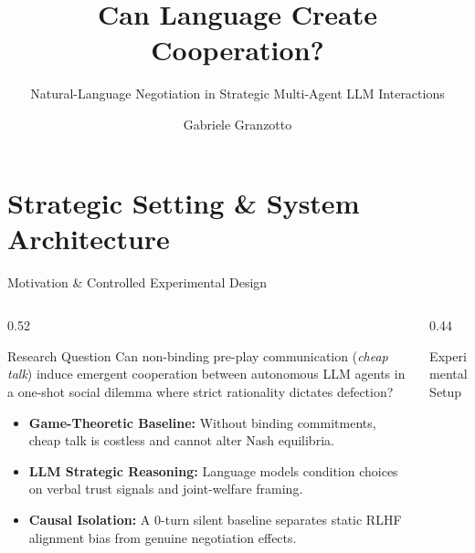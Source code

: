 \documentclass[aspectratio=169, 10pt]{beamer}
\title{Can Language Create Cooperation?}
\subtitle{Natural-Language Negotiation in Strategic Multi-Agent LLM Interactions}
\author{Gabriele Granzotto}
\institute{University of Trieste --- Multi-Agent Systems}
\date{\resizebox{0.88\textwidth}{!}{\texttt{\url{https://github.com/GabrieleGranzotto/Multi-Agent-Language-Model-Cooperation-Analysis}}}}
\begin{document}
\begin{frame}[plain]
    \titlepage
\end{frame}

\section{Strategic Setting \& System Architecture}

\begin{frame}{Motivation \& Controlled Experimental Design}
    \small
    \begin{columns}[T, totalwidth=\textwidth]
        \begin{column}{0.52\textwidth}
            \begin{block}{Research Question}
                Can non-binding pre-play communication (\emph{cheap talk}) induce emergent cooperation between autonomous LLM agents in a one-shot social dilemma where strict rationality dictates defection?
            \end{block}
            \vspace{0.2cm}
            \begin{itemize}
                \setlength{\itemsep}{5pt}
                \item \textbf{Game-Theoretic Baseline:} Without binding commitments, cheap talk is costless and cannot alter Nash equilibria.
                \item \textbf{LLM Strategic Reasoning:} Language models condition choices on verbal trust signals and joint-welfare framing.
                \item \textbf{Causal Isolation:} A $0$-turn silent baseline separates static RLHF alignment bias from genuine negotiation effects.
            \end{itemize}
        \end{column}
        \begin{column}{0.44\textwidth}
            \begin{alertblock}{Experimental Setup}
                \begin{itemize}
                    \setlength{\itemsep}{6pt}

\end{itemize}
\end{alertblock}
\end{column}
\end{columns}
\end{frame}
\end{document}
